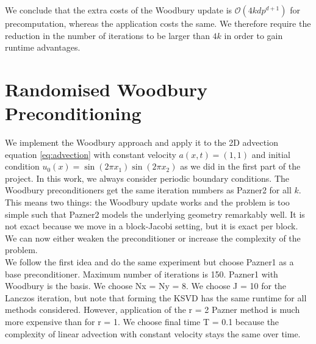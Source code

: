 \documentclass[12pt]{report}
\theoremstyle{remark}
\begin{document}
We conclude that the extra costs of the Woodbury update is $\mathcal{O}(4kd p^{d+1})$ for precomputation, whereas the application costs the same. We therefore require the reduction in the number of iterations to be larger than $4k$ in order to gain runtime advantages.

\section*{Randomised Woodbury Preconditioning}
We implement the Woodbury approach and apply it to the 2D advection equation \ref{eq:advection} with constant velocity $a(x, t) = (1, 1)$ and initial condition $u_0(x) = \sin(2 \pi x_1) \sin(2 \pi x_2)$ as we did in the first part of the project. In this work, we always consider periodic boundary conditions. The Woodbury preconditioners get the same iteration numbers as Pazner2 for all $k$. This means two things: the Woodbury update works and the problem is too simple such that Pazner2 models the underlying geometry remarkably well. It is not exact because we move in a block-Jacobi setting, but it is exact per block. We can now either weaken the preconditioner or increase the complexity of the problem. \\

We follow the first idea and do the same experiment but choose Pazner1 as a base preconditioner. Maximum number of iterations is 150. Pazner1 with Woodbury is the basis. We choose Nx = Ny = 8. We choose J = 10 for the Lanczos iteration, but note that forming the KSVD has the same runtime for all methods considered. However, application of the r = 2 Pazner method is much more expensive than for r = 1. We choose final time T = 0.1 because the complexity of linear advection with constant velocity stays the same over time. \\
\end{document}
